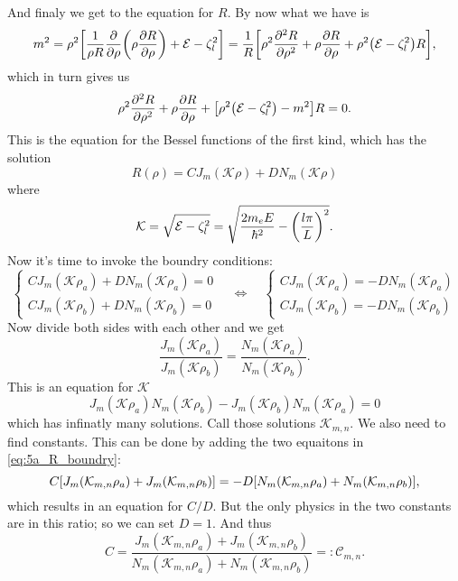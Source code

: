 \documentclass[11pt,letter, swedish, english
]{article}
\begin{document}
And finaly we get to the equation for $R$. By now what we have is
\begin{equation}
m^2=\rho^2\qty[\frac{1}{\rho R}\pdv{\rho}
\qty(\rho\pdv{R}{\rho})+\mathcal{E}-\zeta_l^2]
=\frac{1}{R}\qty[\rho^2\pdv[2]{R}{\rho}
+\rho\pdv{R}{\rho}+\rho^2\qty(\mathcal{E}-\zeta_l^2)R],
\end{equation}
which in turn gives us
\begin{equation}
\rho^2\pdv[2]{R}{\rho}
+\rho\pdv{R}{\rho}+\qty[\rho^2\qty(\mathcal{E}-\zeta_l^2)-m^2]R=0.
\end{equation}
This is the equation for the Bessel functions of the first kind, which
has the solution
\begin{equation}
R(\rho)=CJ_m(\mathcal{K}\rho)+DN_m(\mathcal{K}\rho)
\end{equation}
where
\begin{equation}\label{eq:5a_kappa}
\mathcal{K}=%
\sqrt{\E-\zeta_l^2}=\sqrt{\frac{2m_eE}{\hbar^2}-\qty(\frac{l\pi}{L})^2}.
\end{equation}
Now it's time to invoke the boundry conditions:
\begin{equation}\label{eq:5a_R_boundry}
\begin{cases}
CJ_m(\mathcal{K}\rho_a)+DN_m(\mathcal{K}\rho_a)=0\\
CJ_m(\mathcal{K}\rho_b)+DN_m(\mathcal{K}\rho_b)=0
\end{cases}
\quad\Longleftrightarrow\quad
\begin{cases}
CJ_m(\mathcal{K}\rho_a)=-DN_m(\mathcal{K}\rho_a)\\
CJ_m(\mathcal{K}\rho_b)=-DN_m(\mathcal{K}\rho_b)
\end{cases}
\end{equation}
Now divide both sides with each other and we get
\begin{equation}
\frac{J_m(\mathcal{K}\rho_a)}{J_m(\mathcal{K}\rho_b)}=
\frac{N_m(\mathcal{K}\rho_a)}{N_m(\mathcal{K}\rho_b)}.
\end{equation}
This is an equation for $\mathcal{K}$
\begin{equation}\label{eq:5a_K}
J_m(\mathcal{K}\rho_a)N_m(\mathcal{K}\rho_b)-J_m(\mathcal{K}\rho_b)N_m(\mathcal{K}\rho_a)=0
\end{equation}
which has infinatly many solutions. Call those solutions
$\mathcal{K}_{m,n}$. We also need to find constants. This can be done
by adding the two equaitons in \eqref{eq:5a_R_boundry}:
\begin{equation}
C\qty[J_m(\mathcal{K}_{m,n}\rho_a)+J_m(\mathcal{K}_{m,n}\rho_b)]
=-D\qty[N_m(\mathcal{K}_{m,n}\rho_a)+N_m(\mathcal{K}_{m,n}\rho_b)],
\end{equation}
which results in an equation for $C/D$. But the only physics in the
two constants are in this ratio; so we can set $D=1$. And thus
\begin{equation}\label{eq:5a_C}
C=
\frac{J_m(\mathcal{K}_{m,n}\rho_a)+J_m(\mathcal{K}_{m,n}\rho_b)}
{N_m(\mathcal{K}_{m,n}\rho_a)+N_m(\mathcal{K}_{m,n}\rho_b)}
=:\mathcal{C}_{m,n}.
\end{equation}
\end{document}
